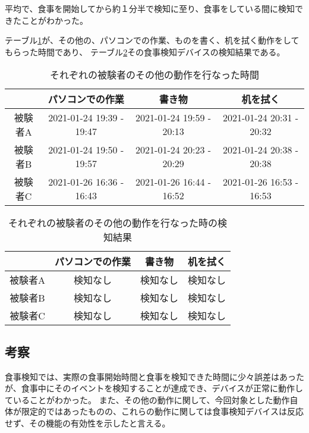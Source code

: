 平均で、食事を開始してから約１分半で検知に至り、食事をしている間に検知できたことがわかった。

テーブル\ref{tb:others_detection_time}が、その他の、パソコンでの作業、ものを書く、机を拭く動作をしてもらった時間であり、
テーブル\ref{tb:others_detection_result}その食事検知デバイスの検知結果である。

\begin{table}[htbp]
  \caption{それぞれの被験者のその他の動作を行なった時間}
  \label{tb:others_detection_time}
  \begin{center}
    \begin{tabular}{|c||c|c|c|}
      \hline
       & パソコンでの作業 & 書き物 & 机を拭く \\
      \hline\hline
      被験者A & 2021-01-24 19:39 - 19:47 & 2021-01-24 19:59 - 20:13 & 2021-01-24 20:31 - 20:32 \\\hline
      被験者B & 2021-01-24 19:50 - 19:57 & 2021-01-24 20:23 - 20:29 & 2021-01-24 20:38 - 20:38  \\\hline
      被験者C & 2021-01-26 16:36 - 16:43 & 2021-01-26 16:44 - 16:52 & 2021-01-26 16:53 - 16:53 \\\hline
    \end{tabular}
  \end{center}
\end{table}

\begin{table}[htbp]
  \caption{それぞれの被験者のその他の動作を行なった時の検知結果}
  \label{tb:others_detection_result}
  \begin{center}
    \begin{tabular}{|c||c|c|c|}
      \hline
       & パソコンでの作業 & 書き物 & 机を拭く \\
      \hline\hline
      被験者A & 検知なし & 検知なし & 検知なし \\\hline
      被験者B & 検知なし & 検知なし & 検知なし \\\hline
      被験者C & 検知なし & 検知なし & 検知なし \\\hline
    \end{tabular}
  \end{center}
\end{table}

\subsection{考察}

食事検知では、実際の食事開始時間と食事を検知できた時間に少々誤差はあったが、食事中にそのイベントを検知することが達成でき、デバイスが正常に動作していることがわかった。
また、その他の動作に関して、今回対象とした動作自体が限定的ではあったものの、これらの動作に関しては食事検知デバイスは反応せず、その機能の有効性を示したと言える。

